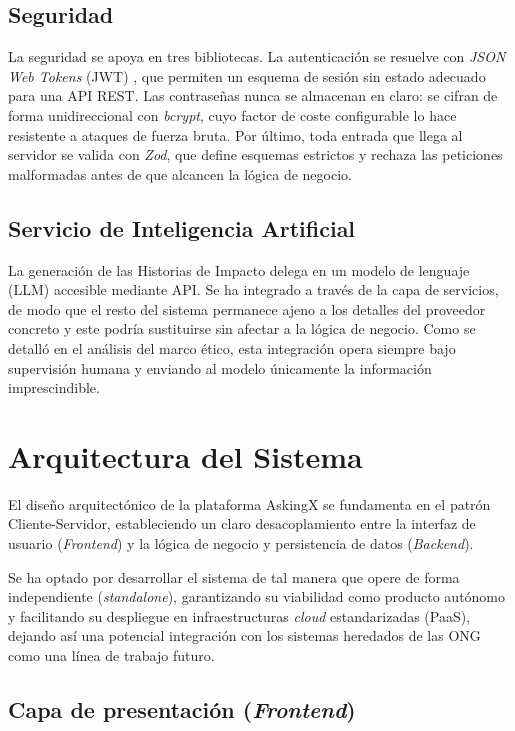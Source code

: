 \documentclass[11pt,oneside,spanish,listoffigures,listoftables]{tfgetsinf}
\begin{document}
\subsection{Seguridad}

La seguridad se apoya en tres bibliotecas. La autenticación se resuelve con \textit{JSON Web Tokens} (JWT) \cite{jwt_rfc}, que permiten un esquema de sesión sin estado adecuado para una API REST. Las contraseñas nunca se almacenan en claro: se cifran de forma unidireccional con \textit{bcrypt}, cuyo factor de coste configurable lo hace resistente a ataques de fuerza bruta. Por último, toda entrada que llega al servidor se valida con \textit{Zod}, que define esquemas estrictos y rechaza las peticiones malformadas antes de que alcancen la lógica de negocio.

\subsection{Servicio de Inteligencia Artificial}

La generación de las Historias de Impacto delega en un modelo de lenguaje (LLM) accesible mediante API. Se ha integrado a través de la capa de servicios, de modo que el resto del sistema permanece ajeno a los detalles del proveedor concreto y este podría sustituirse sin afectar a la lógica de negocio. Como se detalló en el análisis del marco ético, esta integración opera siempre bajo supervisión humana y enviando al modelo únicamente la información imprescindible.

\section{Arquitectura del Sistema}

El diseño arquitectónico de la plataforma AskingX se fundamenta en el patrón Cliente-Servidor, estableciendo un claro desacoplamiento entre la interfaz de usuario (\textit{Frontend}) y la lógica de negocio y persistencia de datos (\textit{Backend}). 

Se ha optado por desarrollar el sistema de tal manera que opere de forma independiente (\textit{standalone}), garantizando su viabilidad como producto autónomo y facilitando su despliegue en infraestructuras \textit{cloud} estandarizadas (PaaS), dejando así una potencial integración con los sistemas heredados de las ONG como una línea de trabajo futuro.

\subsection{Capa de presentación (\textit{Frontend})}
\end{document}
